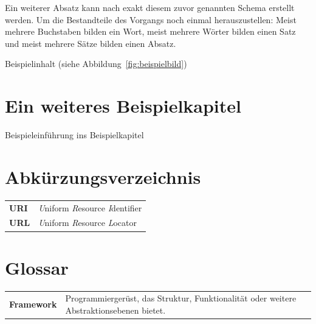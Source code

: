 \documentclass[
	paper=a4, %
	fontsize=11pt, %
	parskip=half, %
	DIV=15, %
	BCOR=22.5mm, %
	headsepline, %
	numbers=noenddot, %
	toc=bibliography %
]{scrbook} %
\begin{document}
Ein weiterer Absatz kann nach exakt diesem zuvor genannten Schema erstellt werden. Um die Bestandteile des Vorgangs noch einmal herauszustellen: Meist mehrere Buchstaben bilden ein Wort, meist mehrere Wörter bilden einen Satz und meist mehrere Sätze bilden einen Absatz.

Beispielinhalt (siehe Abbildung~\ref{fig:beispielbild})


\chapter{Ein weiteres Beispielkapitel}
\label{chap:einweiteresbeispielkapitel}

Beispieleinführung ins Beispielkapitel


\backmatter


\cleardoublepage
\listoffigures
{}


\cleardoublepage
\listoftables
{}


\cleardoublepage
\chapter{Abkürzungsverzeichnis}

\begin{tabularx}{\textwidth}{@{}lX@{}}
\textbf{URI} & \emph{U}niform \emph{R}esource \emph{I}dentifier\\
\textbf{URL} & \emph{U}niform \emph{R}esource \emph{L}ocator\\
\end{tabularx}


\cleardoublepage
\chapter{Glossar}

\begin{tabularx}{\textwidth}{@{}lX@{}}
\textbf{Framework} & Programmiergerüst, das Struktur, Funktionalität oder weitere Abstraktionsebenen bietet.\\
\end{tabularx}


\cleardoublepage
\printbibliography


\let\svaddcontentsline\addcontentsline
\renewcommand\addcontentsline[3]{%
	\ifthenelse{\equal{#1}{lof}}{}%
	{\ifthenelse{\equal{#1}{lot}}{}{\svaddcontentsline{#1}{#2}{#3}}}}
\end{document}
